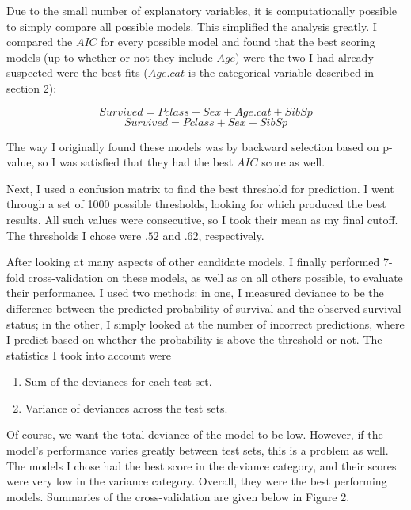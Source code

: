 \documentclass[12pt]{article}
\begin{document}
Due to the small number of explanatory variables, it is computationally possible to simply compare all possible models.  This simplified the analysis greatly.  I compared the $AIC$ for every possible model and found that the best scoring models (up to whether or not they include $Age$) were the two I had already suspected were the best fits ($Age.cat$ is the categorical variable described in section 2):

$$Survived = Pclass + Sex + Age.cat + SibSp$$
$$Survived = Pclass + Sex + SibSp$$

The way I originally found these models was by backward selection based on p-value, so I was satisfied that they had the best $AIC$ score as well.

Next, I used a confusion matrix to find the best threshold for prediction.  I went through a set of 1000 possible thresholds, looking for which produced the best results.  All such values were consecutive, so I took their mean as my final cutoff.  The thresholds I chose were $.52$ and $.62$, respectively.

After looking at many aspects of other candidate models, I finally performed 7-fold cross-validation on these models, as well as on all others possible, to evaluate their performance.  I used two methods: in one, I measured deviance to be the difference between the predicted probability of survival and the observed survival status; in the other, I simply looked at the number of incorrect predictions, where I predict based on whether the probability is above the threshold or not.  The statistics I took into account were
\begin{enumerate}
\item Sum of the deviances for each test set.
\item Variance of deviances across the test sets.
\end{enumerate}
Of course, we want the total deviance of the model to be low.  However, if the model's performance varies greatly between test sets, this is a problem as well.  The models I chose had the best score in the deviance category, and their scores were very low in the variance category.  Overall, they were the best performing models.  Summaries of the cross-validation are given below in Figure 2.
\end{document}

